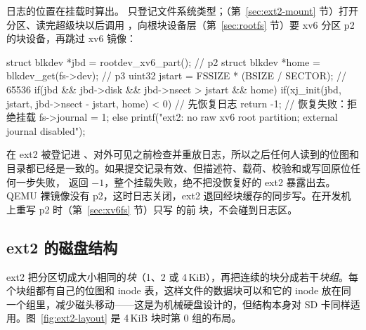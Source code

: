 日志的位置在挂载时算出。 只登记文件系统类型；（第~\ref{sec:ext2-mount} 节）打开分区、读完超级块以后调用 ，向根块设备层（第~\ref{sec:rootfs} 节）要 xv6 分区 p2 的块设备，再跳过 xv6 镜像：

\begin{ccode}
struct blkdev *jbd = rootdev_xv6_part();                   // p2
struct blkdev *home = blkdev_get(fs->dev);                 // p3
uint32 jstart = FSSIZE * (BSIZE / SECTOR);                 // 65536
if(jbd && jbd->disk && jbd->nsect > jstart && home){
  if(xj_init(jbd, jstart, jbd->nsect - jstart, home) < 0)  // 先恢复日志
    return -1;                                             // 恢复失败：拒绝挂载
  fs->journal = 1;
} else
  printf("ext2: no raw xv6 root partition; external journal disabled\n");
\end{ccode}

 在 ext2 被登记进 、对外可见之前检查并重放日志，所以之后任何人读到的位图和目录都已经是一致的。如果提交记录有效、但描述符、载荷、校验和或写回原位任何一步失败， 返回 $-1$，整个挂载失败，绝不把没恢复好的 ext2 暴露出去。QEMU 裸镜像没有 p2，这时日志关闭，ext2 退回经块缓存的同步写。在开发机上重写 p2 时（第~\ref{sec:xv6fs} 节）只写  的前  块，不会碰到日志区。

\subsection{ext2 的磁盘结构}

ext2 把分区切成大小相同的\emph{块}（1、2 或 4\,KiB），再把连续的块分成若干\emph{块组}。每个块组都有自己的位图和 inode 表，这样文件的数据块可以和它的 inode 放在同一个组里，减少磁头移动——这是为机械硬盘设计的，但结构本身对 SD 卡同样适用。图~\ref{fig:ext2-layout} 是 4\,KiB 块时第 0 组的布局。

